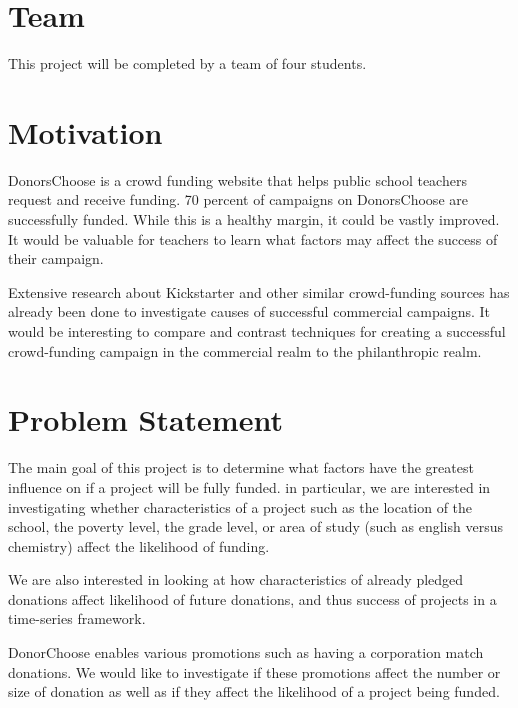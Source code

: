 \documentclass{article}
\begin{document}
 


\section{Team}
This project will be completed by a team of four students.

\section{Motivation}
DonorsChoose is a crowd funding website that helps public school teachers request and receive funding. 70 percent of campaigns on DonorsChoose are successfully funded. While this is a healthy margin, it could be vastly improved. It would be valuable for teachers to learn what factors may affect the success of their campaign.  

Extensive research about Kickstarter and other similar crowd-funding sources has already been done to investigate causes of successful commercial campaigns. It would be interesting to compare and contrast techniques for creating a successful crowd-funding campaign in the commercial realm to the philanthropic realm.

\section{Problem Statement}
The main goal of this project is to determine what factors have the greatest influence on if a project will be fully funded.  in particular, we are interested in investigating whether characteristics of a project such as the location of the school, the poverty level, the grade level, or area of study (such as english versus chemistry) affect the likelihood of funding.  

We are also interested in looking at how characteristics of already pledged donations affect likelihood of future donations, and thus success of projects in a time-series framework.

DonorChoose enables various promotions such as having a corporation match donations.  We would like to investigate if these promotions affect the number or size of donation as well as if they affect the likelihood of a project being funded.
\end{document}
